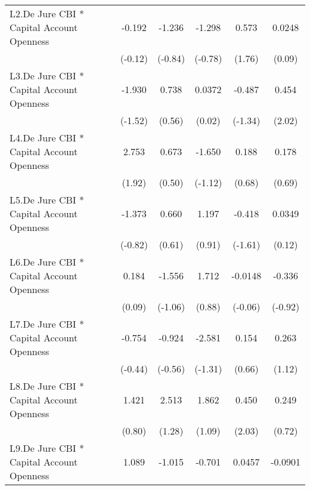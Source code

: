 {\begin{longtable}{l*{5}{c}}
\addlinespace
L2.De Jure CBI * Capital Account Openness&   -0.192         &   -1.236         &   -1.298         &    0.573         &   0.0248         \\
                &  (-0.12)         &  (-0.84)         &  (-0.78)         &   (1.76)         &   (0.09)         \\
\addlinespace
L3.De Jure CBI * Capital Account Openness&   -1.930         &    0.738         &   0.0372         &   -0.487         &    0.454\sym{*}  \\
                &  (-1.52)         &   (0.56)         &   (0.02)         &  (-1.34)         &   (2.02)         \\
\addlinespace
L4.De Jure CBI * Capital Account Openness&    2.753         &    0.673         &   -1.650         &    0.188         &    0.178         \\
                &   (1.92)         &   (0.50)         &  (-1.12)         &   (0.68)         &   (0.69)         \\
\addlinespace
L5.De Jure CBI * Capital Account Openness&   -1.373         &    0.660         &    1.197         &   -0.418         &   0.0349         \\
                &  (-0.82)         &   (0.61)         &   (0.91)         &  (-1.61)         &   (0.12)         \\
\addlinespace
L6.De Jure CBI * Capital Account Openness&    0.184         &   -1.556         &    1.712         &  -0.0148         &   -0.336         \\
                &   (0.09)         &  (-1.06)         &   (0.88)         &  (-0.06)         &  (-0.92)         \\
\addlinespace
L7.De Jure CBI * Capital Account Openness&   -0.754         &   -0.924         &   -2.581         &    0.154         &    0.263         \\
                &  (-0.44)         &  (-0.56)         &  (-1.31)         &   (0.66)         &   (1.12)         \\
\addlinespace
L8.De Jure CBI * Capital Account Openness&    1.421         &    2.513         &    1.862         &    0.450\sym{*}  &    0.249         \\
                &   (0.80)         &   (1.28)         &   (1.09)         &   (2.03)         &   (0.72)         \\
\addlinespace
L9.De Jure CBI * Capital Account Openness&    1.089         &   -1.015         &   -0.701         &   0.0457         &  -0.0901         \\

\end{longtable}}
